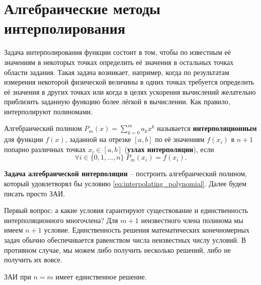 \documentclass[../main.tex]{subfile}
\begin{document}
\section{Алгебраические методы интерполирования}
Задача интерполирования функции состоит в том, чтобы по известным её значениям в
некоторых точках определить её значения в остальных точках области задания.
Такая задача возникает, например, когда по результатам измерения некоторой
физической величины в одних точках требуется определить её значения в других
точках или когда в целях ускорения вычислений желательно приблизить заданную
функцию более лёгкой в вычислении. Как правило, интерполируют полиномами.

\begin{define}\label{eq:interpolating_polynomial}
	Алгебраический полином $P_m(x)=\sum_{k=0}^{m}a_kx^k$ называется
	\textbf{интерполяционным} для функции $f(x)$, заданной на отрезке
	$[a,b]$ по её значениям $f(x_i)$ в $n+1$ попарно различных точках
	$x_i\in[a,b]$ (\textbf{узлах интерполяции}), если
	\[\forall i\in\{0,1,...,n\}\;P_m(x_i)=f(x_i).\]
\end{define}

\begin{define}\label{eq:interpolation_problem}
	\textbf{Задача алгебраической интерполяции} -- построить алгебраический
	полином, который удовлетворял бы условию
	\eqref{eq:interpolating_polynomial}. Далее будем писать просто ЗАИ.
\end{define}

Первый вопрос: а какие условия гарантируют существование и единственность
интерполяционного многочлена? Для $m+1$ неизвестного члена полинома мы имеем
$n+1$ условие. Единственность решения математических конечномерных задач
обычно обеспечивается равенством числа неизвестных числу условий. В противном
случае, мы можем либо получить несколько решений, либо не получить их вовсе.

\begin{theorem}
\label{eq:polynominal_theorem}
	ЗАИ при $n=m$ имеет единственное решение.
\end{theorem}

\beginproof
\end{document}
